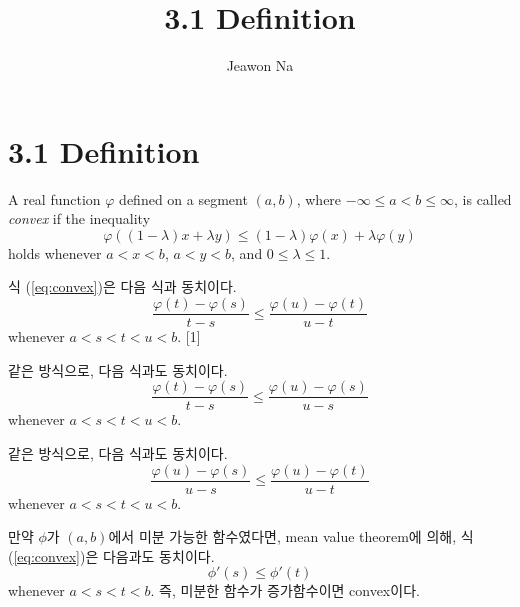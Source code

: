 \documentclass[11pt,reqno]{article}
\renewcommand{\(}{\left(}
\renewcommand{\)}{\right)}
\renewcommand{\[}{\left[}
\renewcommand{\]}{\right]}
\newcommand{\gap}{\vspace{5em}}
\begin{document}
\title{3.1 Definition}
\author{Jeawon Na}
\date{}

\maketitle

\section{3.1 Definition}

A real function $\varphi$ defined on a segment $(a, b)$, where $-\infty \le a < b \le \infty$, is called \textit{convex}
if the inequality
\begin{equation} \label{eq:convex}
  \varphi ((1-\lambda) x + \lambda y) \le (1 - \lambda) \varphi(x) + \lambda \varphi(y)
\end{equation}
holds whenever $a < x < b$, $a < y < b$, and $0 \le \lambda \le 1$.

\gap

식 (\ref{eq:convex})은 다음 식과 동치이다.
\begin{equation}
  \frac{\varphi(t) - \varphi(s)}{t - s} \le \frac{\varphi(u) - \varphi(t)}{u - t}
\end{equation}
whenever $a < s < t < u < b$. [1\label{note:1}]

\gap

같은 방식으로, 다음 식과도 동치이다.
\begin{equation}
  \frac{\varphi(t) - \varphi(s)}{t - s} \le \frac{\varphi(u) - \varphi(s)}{u - s}
\end{equation}
whenever $a < s < t < u < b$.

\gap

같은 방식으로, 다음 식과도 동치이다.
\begin{equation}
  \frac{\varphi(u) - \varphi(s)}{u - s} \le \frac{\varphi(u) - \varphi(t)}{u - t}
\end{equation}
whenever $a < s < t < u < b$.

\gap

만약 $\phi$가 $(a, b)$에서 미분 가능한 함수였다면, mean value theorem에 의해, 식 (\ref{eq:convex})은 다음과도 동치이다.
\begin{equation}
  \phi'(s) \le \phi'(t)
\end{equation}
whenever $a < s < t < b$. 즉, 미분한 함수가 증가함수이면 convex이다.
\end{document}

